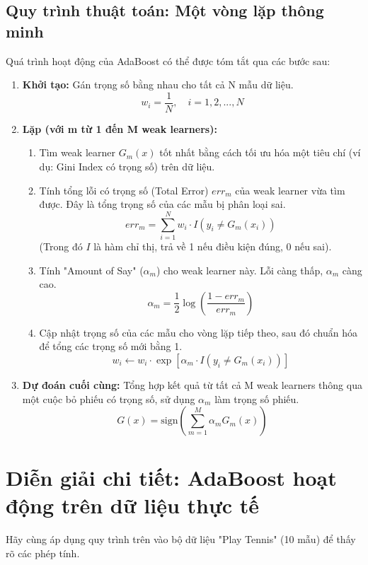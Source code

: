 \subsection{Quy trình thuật toán: Một vòng lặp thông minh}
Quá trình hoạt động của AdaBoost có thể được tóm tắt qua các bước sau:
\begin{enumerate}
    \item \textbf{Khởi tạo:} Gán trọng số bằng nhau cho tất cả N mẫu dữ liệu.
    \[ w_i = \frac{1}{N}, \quad i=1, 2, ..., N \]
    
    \item \textbf{Lặp (với m từ 1 đến M weak learners):}
    \begin{enumerate}
        \item Tìm weak learner $G_m(x)$ tốt nhất bằng cách tối ưu hóa một tiêu chí (ví dụ: Gini Index có trọng số) trên dữ liệu.
        
        \item Tính tổng lỗi có trọng số (Total Error) $err_m$ của weak learner vừa tìm được. Đây là tổng trọng số của các mẫu bị phân loại sai.
        \[ err_m = \sum_{i=1}^{N} w_i \cdot I(y_i \neq G_m(x_i)) \]
        (Trong đó $I$ là hàm chỉ thị, trả về 1 nếu điều kiện đúng, 0 nếu sai).
        
        \item Tính "Amount of Say" ($\alpha_m$) cho weak learner này. Lỗi càng thấp, $\alpha_m$ càng cao.
        \[ \alpha_m = \frac{1}{2} \log\left(\frac{1 - err_m}{err_m}\right) \]
        
        \item Cập nhật trọng số của các mẫu cho vòng lặp tiếp theo, sau đó chuẩn hóa để tổng các trọng số mới bằng 1.
        \[ w_i \leftarrow w_i \cdot \exp\left[\alpha_m \cdot I(y_i \neq G_m(x_i))\right] \]
    \end{enumerate}
    
    \item \textbf{Dự đoán cuối cùng:} Tổng hợp kết quả từ tất cả M weak learners thông qua một cuộc bỏ phiếu có trọng số, sử dụng $\alpha_m$ làm trọng số phiếu.
    \[ G(x) = \text{sign}\left(\sum_{m=1}^{M} \alpha_m G_m(x)\right) \]
\end{enumerate}

\section{Diễn giải chi tiết: AdaBoost hoạt động trên dữ liệu thực tế}
Hãy cùng áp dụng quy trình trên vào bộ dữ liệu "Play Tennis" (10 mẫu) để thấy rõ các phép tính.

